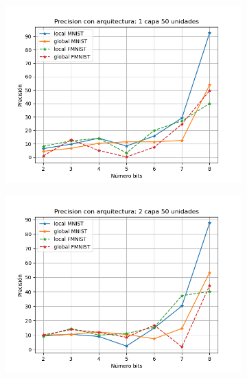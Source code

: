 \begin{figure}[H]
    \begin{subfigure}[H]{0.45\textwidth}
    \includegraphics[width=\textwidth]{imagenes/HSIC/Precision con arquitectura: 1 capa 50 unidades.png}
    \end{subfigure}
    \begin{subfigure}[H]{0.45\textwidth}
    \includegraphics[width=\textwidth]{imagenes/HSIC/Precision con arquitectura: 2 capa 50 unidades.png}
    \end{subfigure}
    \begin{subfigure}[H]{0.45\textwidth}

\end{subfigure}
\end{figure}

